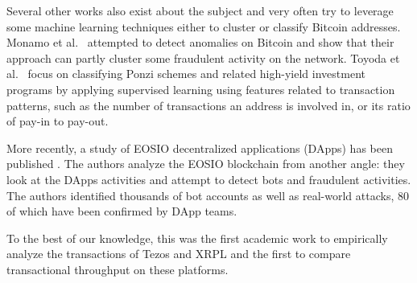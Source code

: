 Several other works also exist about the subject and very often try to leverage some machine learning techniques either to cluster or classify Bitcoin addresses. Monamo et al.~\cite{7802939} attempted to detect anomalies on Bitcoin and show that their approach can partly cluster some fraudulent activity on the network. Toyoda et al.~\cite{8254420} focus on classifying Ponzi schemes and related high-yield investment programs by applying supervised learning using features related to transaction patterns, such as the number of transactions an address is involved in, or its ratio of pay-in to pay-out.

More recently, a study of EOSIO decentralized applications (DApps) has been published \cite{huang2020characterizing}.
The authors analyze the EOSIO blockchain from another angle: they look at the DApps activities and attempt to detect bots and fraudulent activities.
The authors identified thousands of bot accounts as well as real-world attacks, 80 of which have been confirmed by DApp teams.

To the best of our knowledge, this was the first academic work to empirically analyze the transactions of Tezos and XRPL and the first to compare transactional throughput on these platforms.
